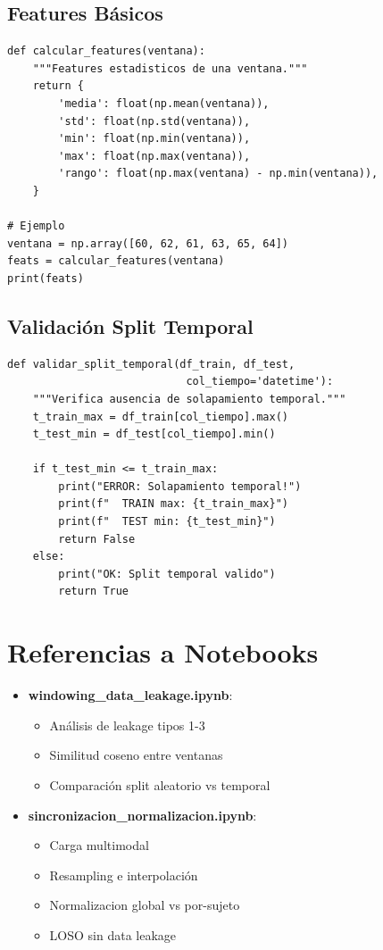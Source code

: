 \documentclass[11pt,twoside,a4paper]{article}
\begin{document}
\subsection{Features Básicos}

\begin{lstlisting}[caption=Extracción de features estadísticos]
def calcular_features(ventana):
    """Features estadisticos de una ventana."""
    return {
        'media': float(np.mean(ventana)),
        'std': float(np.std(ventana)),
        'min': float(np.min(ventana)),
        'max': float(np.max(ventana)),
        'rango': float(np.max(ventana) - np.min(ventana)),
    }

# Ejemplo
ventana = np.array([60, 62, 61, 63, 65, 64])
feats = calcular_features(ventana)
print(feats)
\end{lstlisting}

\subsection{Validación Split Temporal}

\begin{lstlisting}[caption=Validar split temporal sin leakage]
def validar_split_temporal(df_train, df_test,
                            col_tiempo='datetime'):
    """Verifica ausencia de solapamiento temporal."""
    t_train_max = df_train[col_tiempo].max()
    t_test_min = df_test[col_tiempo].min()

    if t_test_min <= t_train_max:
        print("ERROR: Solapamiento temporal!")
        print(f"  TRAIN max: {t_train_max}")
        print(f"  TEST min: {t_test_min}")
        return False
    else:
        print("OK: Split temporal valido")
        return True
\end{lstlisting}

\section{Referencias a Notebooks}

\begin{itemize}
    \item \textbf{windowing\_data\_leakage.ipynb}:
    \begin{itemize}
        \item Análisis de leakage tipos 1-3
        \item Similitud coseno entre ventanas
        \item Comparación split aleatorio vs temporal
    \end{itemize}

    \item \textbf{sincronizacion\_normalizacion.ipynb}:
    \begin{itemize}
        \item Carga multimodal
        \item Resampling e interpolación
        \item Normalizacion global vs por-sujeto
        \item LOSO sin data leakage
    \end{itemize}
\end{itemize}
\end{document}
